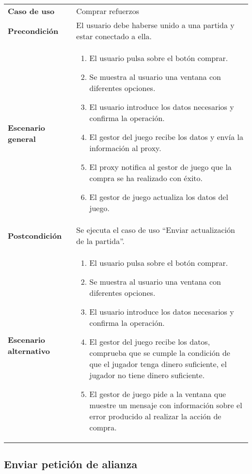 {\footnotesize
\begin{tabularx}{0.95\textwidth}{p{}|X}

\textbf{Caso de uso} & Comprar refuerzos \\

\textbf{Precondición} & El usuario debe haberse unido a una partida y estar
conectado a ella. \\

\textbf{Escenario general} & \begin{enumerate}
\item El usuario pulsa sobre el botón comprar.
\item Se muestra al usuario una ventana con diferentes opciones.
\item El usuario introduce los datos necesarios y confirma la operación.
\item El gestor del juego recibe los datos y env\'ia la información al proxy.
\item El proxy notifica al gestor de juego que la compra se ha realizado con
\'exito.
\item El gestor de juego actualiza los datos del juego.
\end{enumerate} \\
\textbf{Postcondición} & Se ejecuta el caso de uso  ``Enviar actualización de
la partida''. \\
\textbf{Escenario alternativo} & \begin{enumerate}
\item El usuario pulsa sobre el botón comprar.
\item Se muestra al usuario una ventana con diferentes opciones.
\item El usuario introduce los datos necesarios y confirma la operación.
\item El gestor del juego recibe los datos, comprueba que se cumple la condición
de que el jugador tenga dinero suficiente, el jugador no tiene dinero
suficiente.
\item El gestor de juego pide a la ventana que muestre un mensaje con
información sobre el error producido al realizar la acción de compra.
\end{enumerate}\\
\end{tabularx}
}

\subsection{Enviar petición de alianza}

